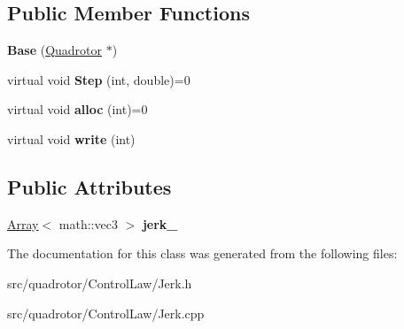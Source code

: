 \subsection*{\-Public \-Member \-Functions}
\begin{DoxyCompactItemize}
\item 
\hypertarget{classJerk_1_1Base_a626934eaadb98821638f7e372a4d3268}{{\bfseries \-Base} (\hyperlink{classQuadrotor}{\-Quadrotor} $\ast$)}\label{classJerk_1_1Base_a626934eaadb98821638f7e372a4d3268}

\item 
\hypertarget{classJerk_1_1Base_ac1207a2bf6d282ef432c072f99f57ef9}{virtual void {\bfseries \-Step} (int, double)=0}\label{classJerk_1_1Base_ac1207a2bf6d282ef432c072f99f57ef9}

\item 
\hypertarget{classJerk_1_1Base_aaa5aed35c31b51ef88dfcf82dc5c5f19}{virtual void {\bfseries alloc} (int)=0}\label{classJerk_1_1Base_aaa5aed35c31b51ef88dfcf82dc5c5f19}

\item 
\hypertarget{classJerk_1_1Base_ada482e98d0fe0542ce063a7413100f8f}{virtual void {\bfseries write} (int)}\label{classJerk_1_1Base_ada482e98d0fe0542ce063a7413100f8f}

\end{DoxyCompactItemize}
\subsection*{\-Public \-Attributes}
\begin{DoxyCompactItemize}
\item 
\hypertarget{classJerk_1_1Base_ae888b2ce4264998d26bb0bbfce51b5e7}{\hyperlink{classArray}{\-Array}$<$ math\-::vec3 $>$ {\bfseries jerk\-\_\-}}\label{classJerk_1_1Base_ae888b2ce4264998d26bb0bbfce51b5e7}

\end{DoxyCompactItemize}


\-The documentation for this class was generated from the following files\-:\begin{DoxyCompactItemize}
\item 
src/quadrotor/\-Control\-Law/\-Jerk.\-h\item 
src/quadrotor/\-Control\-Law/\-Jerk.\-cpp\end{DoxyCompactItemize}
